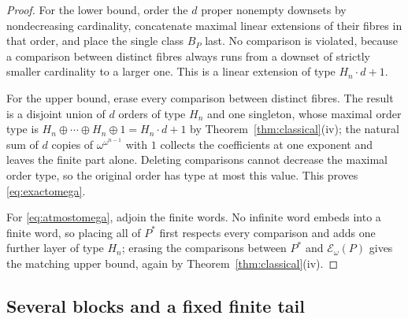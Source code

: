 \documentclass[11pt,a4paper]{article}
\numberwithin{equation}{section}
\theoremstyle{definition}
\theoremstyle{remark}
\newcommand{\Hn}[1]{H_{#1}}
\newcommand{\E}{\mathcal E}
\begin{document}
\begin{proof}
For the lower bound, order the $d$ proper nonempty downsets by nondecreasing
cardinality, concatenate maximal linear extensions of their fibres in that
order, and place the single class $B_P$ last. No comparison is violated,
because a comparison between distinct fibres always runs from a downset of
strictly smaller cardinality to a larger one. This is a linear extension of
type $\Hn n\cdot d+1$.

For the upper bound, erase every comparison between distinct fibres. The
result is a disjoint union of $d$ orders of type $\Hn n$ and one singleton,
whose maximal order type is
$\Hn n\oplus\cdots\oplus\Hn n\oplus1=\Hn n\cdot d+1$ by
Theorem~\ref{thm:classical}(iv); the natural sum of $d$ copies of
$\omega^{\omega^{n-1}}$ with $1$ collects the coefficients at one exponent and
leaves the finite part alone. Deleting comparisons cannot decrease the
maximal order type, so the original order has type at most this value. This
proves \eqref{eq:exactomega}.

For \eqref{eq:atmostomega}, adjoin the finite words. No infinite word embeds
into a finite word, so placing all of $P^*$ first respects every comparison
and adds one further layer of type $\Hn n$; erasing the comparisons between
$P^*$ and $\E_\omega(P)$ gives the matching upper bound, again by
Theorem~\ref{thm:classical}(iv).
\end{proof}

\subsection{Several blocks and a fixed finite tail}
\end{document}
